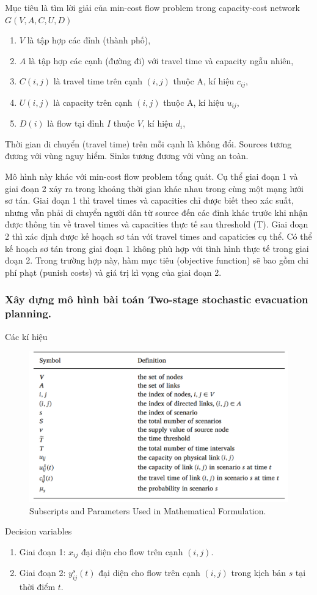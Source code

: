 \documentclass[a4paper]{article}
\begin{document}
{Mục tiêu là tìm lời giải của min-cost flow problem trong capacity-cost network $G(V, A, C, U, D)$}
\begin{enumerate}
    \item[] {$V$ là tập hợp các đỉnh (thành phố), }
	\item[]	{$A$ là tập hợp các cạnh (đường đi) với travel time và capacity ngẫu nhiên, }
	\item[]	{$C(i, j)$ là travel time trên cạnh $(i, j)$ thuộc A, kí hiệu $c_{ij}$,}
	\item[] {$U(i, j)$ là capacity trên cạnh $(i, j)$ thuộc A, kí hiệu $u_{ij}$,}
	\item[] {$D(i)$ là flow tại đỉnh $I$ thuộc $V$, kí hiệu $d_i$,}
\end{enumerate}
{Thời gian di chuyển (travel time) trên mỗi cạnh là không đổi. Sources tương đương với vùng nguy hiểm. Sinks tương đương với vùng an toàn.}

{Mô hình này khác với min-cost flow problem tổng quát. Cụ thể giai đoạn 1 và giai đoạn 2 xảy ra trong khoảng thời gian khác nhau trong cùng một mạng lưới sơ tán. Giai đoạn 1 thì travel times và capacities chỉ được biết theo xác suất, nhưng vẫn phải di chuyển người dân từ source đến các đỉnh khác trước khi nhận được thông tin về travel times và capacities thực tế sau threshold (T). Giai đoạn 2 thì xác định được kế hoạch sơ tán với travel times and capaticies cụ thể. Có thể kế hoạch sơ tán trong giai đoạn 1 không phù hợp với tình hình thực tế trong giai đoạn 2. Trong trường hợp này, hàm mục tiêu (objective function) sẽ bao gồm chi phí phạt (punish costs) và giá trị kì vọng của giai đoạn 2.}
\subsubsection{Xây dựng mô hình bài toán Two-stage stochastic evacuation planning. }
{Các kí hiệu}
\begin{figure}[h]
    \centering
    \includegraphics[scale=0.5]{table_1.png}
    \caption{Subscripts and Parameters Used in Mathematical Formulation.}
    \label{fig:enter-label}
\end{figure}
\newpage
{Decision variables}
\begin{enumerate}
    \item[] {Giai đoạn 1: $x_{ij}$ đại diện cho flow trên cạnh $(i, j)$.}
    \item[] {Giai đoạn 2: $y_{ij}^s(t)$ đại diện cho flow trên cạnh $(i, j)$ trong kịch bản $s$ tại thời điểm $t$.}   
\end{enumerate}
\end{document}
